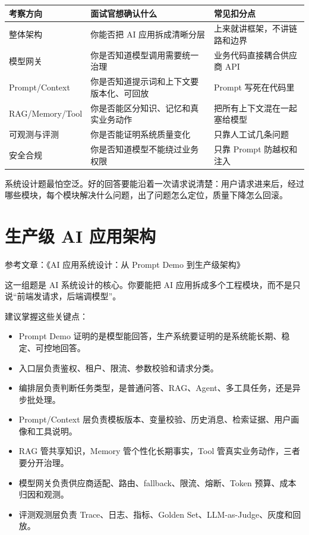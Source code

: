 \documentclass[9pt,a4paper,twocolumn]{ctexart}
\begin{document}
{\footnotesize
\begin{tabular}{|p{}|p{}|p{}|}
\hline
\textbf{考察方向} & \textbf{面试官想确认什么} & \textbf{常见扣分点} \\
\hline
整体架构 & 你能否把 AI 应用拆成清晰分层 & 上来就讲框架，不讲链路和边界 \\
\hline
模型网关 & 你是否知道模型调用需要统一治理 & 业务代码直接耦合供应商 API \\
\hline
Prompt/Context & 你是否知道提示词和上下文要版本化、可回放 & Prompt 写死在代码里 \\
\hline
RAG/Memory/Tool & 你是否能区分知识、记忆和真实业务动作 & 把所有上下文混在一起塞给模型 \\
\hline
可观测与评测 & 你是否能证明系统质量变化 & 只靠人工试几条问题 \\
\hline
安全合规 & 你是否知道模型不能绕过业务权限 & 只靠 Prompt 防越权和注入 \\
\hline
\end{tabular}
}



系统设计题最怕空泛。好的回答要能沿着一次请求说清楚：用户请求进来后，经过哪些模块，每个模块解决什么问题，出了问题怎么定位，质量下降怎么回滚。



\section*{生产级 AI 应用架构}


参考文章：《AI 应用系统设计：从 Prompt Demo 到生产级架构》



这一组题是 AI 系统设计的核心。你要能把 AI 应用拆成多个工程模块，而不是只说“前端发请求，后端调模型”。



建议掌握这些关键点：


\begin{itemize}[itemsep=1pt, topsep=2pt]
  \item Prompt Demo 证明的是模型能回答，生产系统要证明的是系统能长期、稳定、可控地回答。
  \item 入口层负责鉴权、租户、限流、参数校验和请求分类。
  \item 编排层负责判断任务类型，是普通问答、RAG、Agent、多工具任务，还是异步批处理。
  \item Prompt/Context 层负责模板版本、变量校验、历史消息、检索证据、用户画像和工具说明。
  \item RAG 管共享知识，Memory 管个性化长期事实，Tool 管真实业务动作，三者要分开治理。
  \item 模型网关负责供应商适配、路由、fallback、限流、熔断、Token 预算、成本归因和观测。
  \item 评测观测层负责 Trace、日志、指标、Golden Set、LLM-as-Judge、灰度和回放。
\end{itemize}
\end{document}
